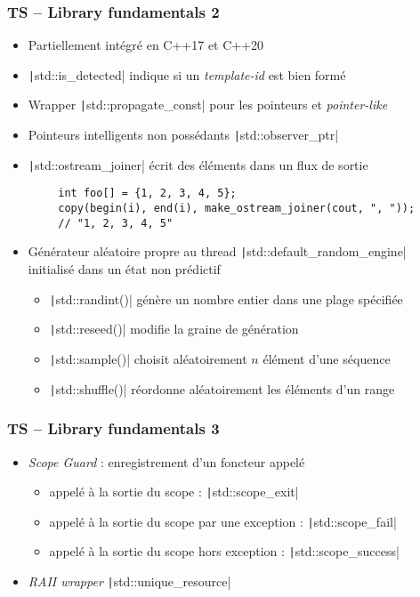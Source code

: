 \documentclass[C++.tex]{subfiles}
\begin{document}
\begin{frame}[fragile]
	\frametitle{TS -- Library fundamentals 2}
	\begin{itemize}
		\item Partiellement intégré en C++17 et C++20
		\item \texttt|std::is_detected| indique si un \textit{template-id} est bien formé
		\item Wrapper \texttt|std::propagate_const| pour les pointeurs et \textit{pointer-like}
		\item Pointeurs intelligents non possédants \texttt|std::observer_ptr|
		\item \texttt|std::ostream_joiner| écrit des éléments dans un flux de sortie
	\end{itemize}

	\begin{verbatim}
		int foo[] = {1, 2, 3, 4, 5};
		copy(begin(i), end(i), make_ostream_joiner(cout, ", "));
		// "1, 2, 3, 4, 5"
	\end{verbatim}

	\begin{itemize}
		\item Générateur aléatoire propre au thread \texttt|std::default_random_engine| initialisé dans un état non prédictif
		\begin{itemize}
			\item \texttt|std::randint()| génère un nombre entier dans une plage spécifiée
			\item \texttt|std::reseed()| modifie la graine de génération
			\item \texttt|std::sample()| choisit aléatoirement $n$ élément d'une séquence
			\item \texttt|std::shuffle()| réordonne aléatoirement les éléments d'un range
		\end{itemize}
	\end{itemize}

\end{frame}

\begin{frame}[fragile]
	\frametitle{TS -- Library fundamentals 3}
	\begin{itemize}
		\item \textit{Scope Guard} : enregistrement d'un foncteur appelé
		\begin{itemize}
			\item appelé à la sortie du scope : \texttt|std::scope_exit|
			\item appelé à la sortie du scope par une exception : \texttt|std::scope_fail|
			\item appelé à la sortie du scope hors exception : \texttt|std::scope_success|
		\end{itemize}
		\item \textit{RAII wrapper} \texttt|std::unique_resource|
	\end{itemize}

\end{frame}
\end{document}
